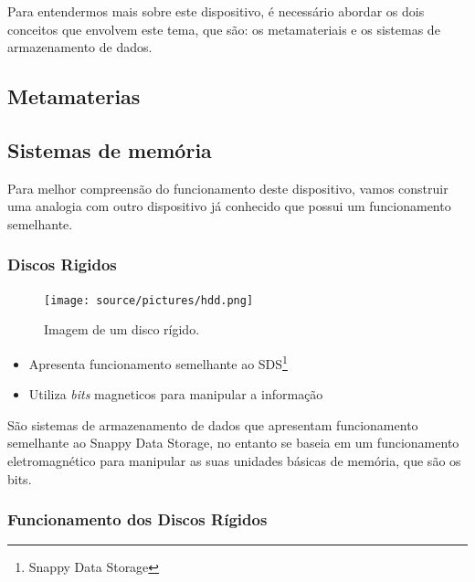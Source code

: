     Para entendermos mais sobre este dispositivo, é necessário abordar os dois conceitos que envolvem este tema, que são: os metamateriais e os sistemas de armazenamento de dados. 

\subsection{Metamaterias}

\subsection{Sistemas de memória}
    Para melhor compreensão do funcionamento deste dispositivo, vamos construir uma analogia com outro dispositivo já conhecido que possui um funcionamento semelhante.

\subsubsection{Discos Rigidos}

    \begin{figure}[H]
        \centering
        \texttt{[image: source/pictures/hdd.png]}
        \caption{Imagem de um disco rígido\cite{hdd-image}.}
        \label{fig:hdd}
    \end{figure}

    \begin{itemize}
        \item Apresenta funcionamento semelhante ao SDS\footnote{Snappy Data Storage}
        \item Utiliza \textit{bits} magneticos para manipular a informação
    
    \end{itemize}

    São sistemas de armazenamento de dados que apresentam funcionamento semelhante ao Snappy Data Storage, no entanto se baseia em um funcionamento eletromagnético para manipular as suas unidades básicas de memória, que são os bits.

\subsubsection{Funcionamento dos Discos Rígidos}

